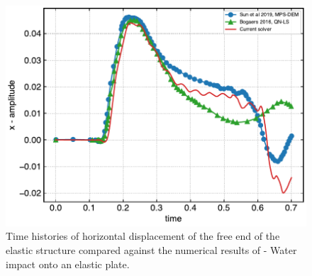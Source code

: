 \begin{figure}
  \centering
  \includegraphics[scale=0.45]{figures/fsi/figures/sun_2019_dam_breaking_flow_impacting_an_elastic_plate/x_amplitude}
  \caption{Time histories of horizontal displacement of the free end of the
    elastic structure compared against the numerical results of
    \parencite{sun2019fully,bogaers2016evaluation}- Water impact onto an elastic
    plate.}
\label{fig:water-impact-plate-deflection-quantitative}
\end{figure}
